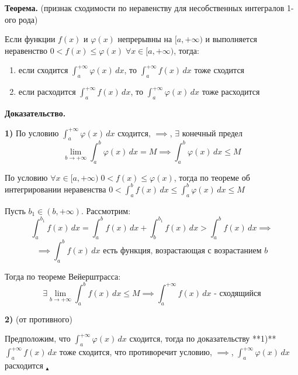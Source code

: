 \documentclass[11pt]{article}
\begin{document}
\par\textbf{Теорема.} (признак сходимости по неравенству для несобственных интегралов 1-ого рода)
\par Если функции $f(x)$ и $\varphi(x)$ непрерывны на $[a, +\infty)$ и выполняется неравенство $0 < f(x) \leq \varphi(x) \; \forall x \in [a, +\infty)$, тогда:
\begin{enumerate}
\item если сходится $\int_{a}^{+\infty} \varphi(x) \, dx$, то $\int_{a}^{+\infty} f(x) \, dx$ тоже сходится
\item если расходится $\int_{a}^{+\infty} f(x) \, dx$, то $\int_{a}^{+\infty} \varphi(x) \, dx$ тоже расходится
\end{enumerate}
\par\textbf{Доказательство.}
\par\textbf{1)} По условию $\int_{a}^{+\infty} \varphi(x) \, dx$ сходится, $\implies$, $\exists$ конечный предел $$\lim_{b \to +\infty}{\int_{a}^b \varphi(x) \, dx } = M \implies \int_{a}^{b} \varphi(x) \, dx \leq M$$
\par По условию $\forall x \in [a, +\infty) \; 0 < f(x) \leq \varphi(x)$, тогда по теореме об интегрировании неравенства  $0 < \int_{a}^b f(x) \, dx \leq \int_{a}^{b} \varphi(x) \, dx \leq M$
\par Пусть $b_{1} \in (b, +\infty)$. Рассмотрим:
$$\int_{a}^{b_{1}} f(x) \, dx = \int_{a}^{b} f(x) \, dx + \int_{b}^{b_{1}} f(x) \, dx > \int_{a}^{b} f(x) \, dx \implies$$
$$\implies \int_{a}^{b} f(x) \, dx \text{ есть функция, возрастающая с возрастанием } b$$
\par Тогда по теореме Вейерштрасса: $$\exists \lim_{ b \to +\infty } \int_{a}^{b} f(x) \, dx \leq M \implies \int_{a}^{+\infty} f(x) \, dx \text{ - сходящийся}$$
\par\textbf{2)} (от противного)
\par Предположим, что $\int_{a}^{+\infty} \varphi(x) \, dx$ сходится, тогда по доказательству **1)** $\int_{a}^{+\infty} f(x) \, dx$ тоже сходится, что противоречит условию, $\implies$, $\int_{a}^{+\infty} \varphi(x) \, dx$ расходится $_\blacktriangle$
\end{document}
